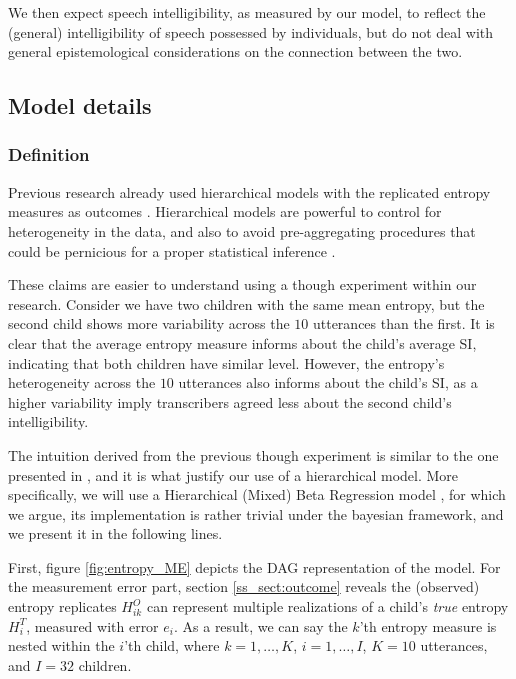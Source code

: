 We then expect speech intelligibility, as measured by our model, to reflect the (general) intelligibility of speech possessed by individuals, but do not deal with general epistemological considerations on the connection between the two.
%
%
\subsection{Model details} \label{sSA:model_details}
%
\subsubsection{Definition} \label{ssSA:model_definition}
%
Previous research already used hierarchical models with the replicated entropy measures as outcomes \citep{Boonen_et_al_2021, Faes_et_al_2021}. Hierarchical models are powerful to control for heterogeneity in the data, and also to avoid pre-aggregating procedures that could be pernicious for a proper statistical inference \citep{McElreath_2020}. 

These claims are easier to understand using a though experiment within our research. Consider we have two children with the same mean entropy, but the second child shows more variability across the $10$ utterances than the first. It is clear that the average entropy measure informs about the child's average SI, indicating that both children have similar level. However, the entropy's heterogeneity across the $10$ utterances also informs about the child's SI, as a higher variability imply transcribers agreed less about the second child's intelligibility.

The intuition derived from the previous though experiment is similar to the one presented in \citet{Boonen_et_al_2021}, and it is what justify our use of a hierarchical model. More specifically, we will use a Hierarchical (Mixed) Beta Regression model \citep{Figueroa-Zuniga_et_al_2013}, for which we argue, its implementation is rather trivial under the bayesian framework, and we present it in the following lines.

First, figure \ref{fig:entropy_ME} depicts the DAG representation of the model. For the measurement error part, section \ref{ss_sect:outcome} reveals the (observed) entropy replicates $H^{O}_{ik}$ can represent multiple realizations of a child's \textit{true} entropy $H^{T}_{i}$, measured with error $e_i$. As a result, we can say the $k$'th entropy measure is nested within the $i$'th child, where $k=1, \dots, K$, $i=1, \dots, I$, $K = 10$ utterances, and $I = 32$ children.

